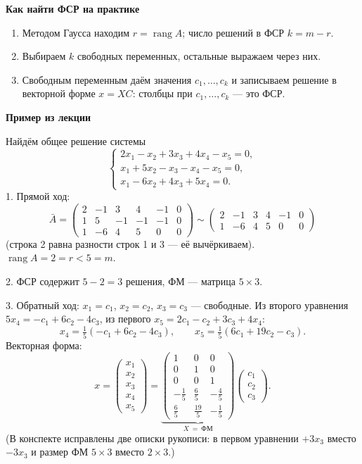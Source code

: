 \documentclass[a4paper,11pt]{article}
\DeclareMathOperator{\rang}{rang}
\newcommand{\podr}[1]{\par\needspace{8\baselineskip}\medskip
  {\large\bfseries\textcolor{oprc!80!black}{#1}}\par\nopagebreak\smallskip}
\begin{document}
\podr{Как найти ФСР на практике}

\begin{enumerate}[leftmargin=*]
  \item Методом Гаусса находим $r = \rang A$; число решений в ФСР $k = m - r$.
  \item Выбираем $k$ свободных переменных, остальные выражаем через них.
  \item Свободным переменным даём значения $c_1, \dots, c_k$ и записываем решение в векторной форме $x = XC$:
        столбцы при $c_1, \dots, c_k$ --- это ФСР.
\end{enumerate}

\podr{Пример из лекции}

Найдём общее решение системы
\[
  \begin{cases}
    2x_1 - x_2 + 3x_3 + 4x_4 - x_5 = 0, \\
    x_1 + 5x_2 - x_3 - x_4 - x_5 = 0, \\
    x_1 - 6x_2 + 4x_3 + 5x_4 = 0.
  \end{cases}
\]
1. Прямой ход:
\[
  \bar A = \left(\begin{array}{rrrrr|r} 2 & -1 & 3 & 4 & -1 & 0 \\ 1 & 5 & -1 & -1 & -1 & 0 \\ 1 & -6 & 4 & 5 & 0 & 0 \end{array}\right)
  \sim \left(\begin{array}{rrrrr|r} 2 & -1 & 3 & 4 & -1 & 0 \\ 1 & -6 & 4 & 5 & 0 & 0 \end{array}\right)
\]
(строка 2 равна разности строк 1 и 3 --- её вычёркиваем). $\rang A = 2 = r < 5 = m$.

2. ФСР содержит $5 - 2 = 3$ решения, ФМ --- матрица $5 \times 3$.

3. Обратный ход: $x_1 = c_1$, $x_2 = c_2$, $x_3 = c_3$ --- свободные. Из второго уравнения
$5x_4 = -c_1 + 6c_2 - 4c_3$, из первого $x_5 = 2c_1 - c_2 + 3c_3 + 4x_4$:
\[
  x_4 = \tfrac15(-c_1 + 6c_2 - 4c_3), \qquad x_5 = \tfrac15(6c_1 + 19c_2 - c_3).
\]
Векторная форма:
\[
  x = \begin{pmatrix} x_1 \\ x_2 \\ x_3 \\ x_4 \\ x_5 \end{pmatrix}
  = \underbrace{\begin{pmatrix} 1 & 0 & 0 \\ 0 & 1 & 0 \\ 0 & 0 & 1 \\ -\frac15 & \frac65 & -\frac45 \\[2pt] \frac65 & \frac{19}5 & -\frac15 \end{pmatrix}}_{X\ =\ \text{ФМ}}
  \begin{pmatrix} c_1 \\ c_2 \\ c_3 \end{pmatrix}.
\]
{\small\textcolor{zamc}{(В конспекте исправлены две описки рукописи: в первом уравнении $+3x_3$ вместо $-3x_3$
и размер ФМ $5 \times 3$ вместо $2 \times 3$.)}}
\end{document}

